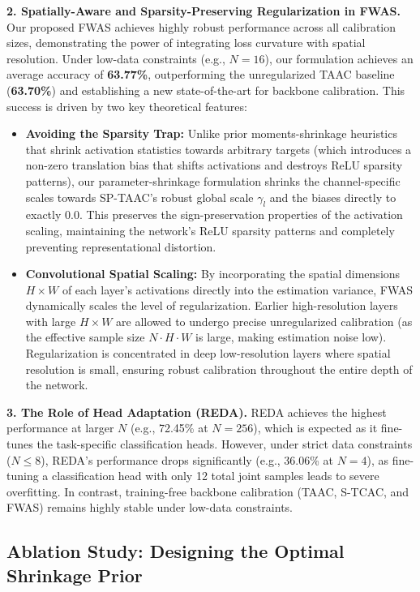 \documentclass{article}
\theoremstyle{plain}
\theoremstyle{definition}
\theoremstyle{remark}
\begin{document}
\textbf{2. Spatially-Aware and Sparsity-Preserving Regularization in FWAS.} Our proposed FWAS achieves highly robust performance across all calibration sizes, demonstrating the power of integrating loss curvature with spatial resolution. Under low-data constraints (e.g., $N=16$), our formulation achieves an average accuracy of \textbf{63.77\%}, outperforming the unregularized TAAC baseline (\textbf{63.70\%}) and establishing a new state-of-the-art for backbone calibration. This success is driven by two key theoretical features:
\begin{itemize}
    \item \textbf{Avoiding the Sparsity Trap:} Unlike prior moments-shrinkage heuristics that shrink activation statistics towards arbitrary targets (which introduces a non-zero translation bias that shifts activations and destroys ReLU sparsity patterns), our parameter-shrinkage formulation shrinks the channel-specific scales towards SP-TAAC's robust global scale $\gamma_l$ and the biases directly to exactly $0.0$. This preserves the sign-preservation properties of the activation scaling, maintaining the network's ReLU sparsity patterns and completely preventing representational distortion.
    \item \textbf{Convolutional Spatial Scaling:} By incorporating the spatial dimensions $H \times W$ of each layer's activations directly into the estimation variance, FWAS dynamically scales the level of regularization. Earlier high-resolution layers with large $H \times W$ are allowed to undergo precise unregularized calibration (as the effective sample size $N \cdot H \cdot W$ is large, making estimation noise low). Regularization is concentrated in deep low-resolution layers where spatial resolution is small, ensuring robust calibration throughout the entire depth of the network.
\end{itemize}

\textbf{3. The Role of Head Adaptation (REDA).} REDA achieves the highest performance at larger $N$ (e.g., 72.45\% at $N=256$), which is expected as it fine-tunes the task-specific classification heads. However, under strict data constraints ($N \le 8$), REDA's performance drops significantly (e.g., 36.06\% at $N=4$), as fine-tuning a classification head with only 12 total joint samples leads to severe overfitting. In contrast, training-free backbone calibration (TAAC, S-TCAC, and FWAS) remains highly stable under low-data constraints.

\subsection{Ablation Study: Designing the Optimal Shrinkage Prior}
\label{sec:ablation}
\end{document}
